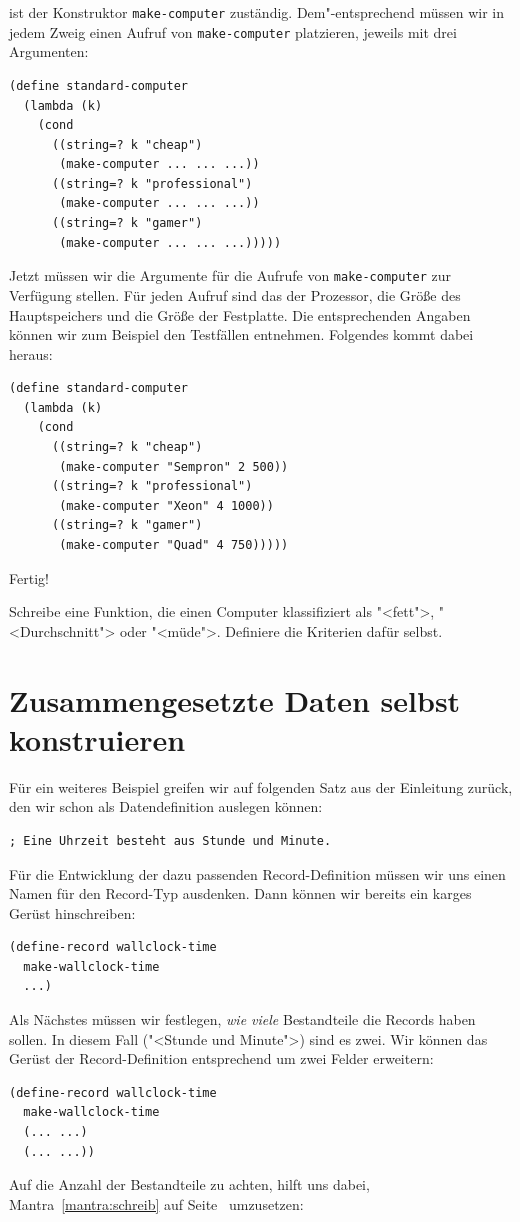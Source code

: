ist der Konstruktor \lstinline{make-computer} zuständig.  Dem"-entsprechend
müssen wir in jedem Zweig einen Aufruf von \lstinline{make-computer}
platzieren, jeweils mit drei Argumenten:
%
\begin{lstlisting}
(define standard-computer
  (lambda (k)
    (cond
      ((string=? k "cheap")
       (make-computer ... ... ...))
      ((string=? k "professional")
       (make-computer ... ... ...))
      ((string=? k "gamer")
       (make-computer ... ... ...)))))
\end{lstlisting}
%
Jetzt müssen wir die Argumente für die Aufrufe von
\lstinline{make-computer} zur Verfügung stellen.  Für jeden Aufruf sind
das der Prozessor, die Größe des Hauptspeichers und die
Größe der Festplatte.  Die entsprechenden Angaben können wir zum
Beispiel den Testfällen entnehmen.  Folgendes kommt dabei heraus:
%
\begin{lstlisting}
(define standard-computer
  (lambda (k)
    (cond
      ((string=? k "cheap")
       (make-computer "Sempron" 2 500))
      ((string=? k "professional")
       (make-computer "Xeon" 4 1000))
      ((string=? k "gamer")
       (make-computer "Quad" 4 750)))))
\end{lstlisting}
%
Fertig!

\begin{aufgabeinline}
  Schreibe eine Funktion, die einen Computer klassifiziert als
  "<fett">, "<Durchschnitt"> oder "<müde">.  Definiere die Kriterien
  dafür selbst.
\end{aufgabeinline}

\section{Zusammengesetzte Daten selbst konstruieren}

%
Für ein weiteres Beispiel greifen wir auf folgenden Satz aus der
Einleitung zurück, den wir schon als Datendefinition auslegen können:
%
\begin{lstlisting}
; Eine Uhrzeit besteht aus Stunde und Minute.
\end{lstlisting}
%
Für die Entwicklung der dazu passenden Record-Definition müssen wir
uns einen Namen für den Record-Typ ausdenken.  Dann können wir bereits
ein karges Gerüst hinschreiben:
%
\begin{lstlisting}
(define-record wallclock-time
  make-wallclock-time
  ...)
\end{lstlisting}
%
Als Nächstes müssen wir festlegen, \emph{wie viele} Bestandteile die
Records haben sollen.  In diesem Fall ("<Stunde und Minute">) sind es
zwei.  Wir können das Gerüst der Record-Definition
entsprechend um zwei Felder erweitern:
%
\begin{lstlisting}
(define-record wallclock-time
  make-wallclock-time
  (... ...)
  (... ...))
\end{lstlisting}
%
Auf die Anzahl der Bestandteile zu achten, hilft uns dabei, 
Mantra~\ref{mantra:schreib} auf Seite~\pageref{mantra:schreib}
umzusetzen:


